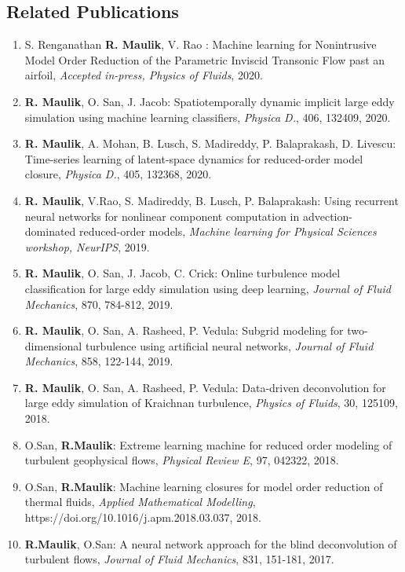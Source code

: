 \documentclass[11pt]{article}
\begin{document}
\subsection*{Related Publications}
\begin{enumerate}
\parskip = -2pt

\item S. Renganathan \textbf{R. Maulik}, V. Rao : Machine learning for Nonintrusive Model Order Reduction of the Parametric Inviscid Transonic Flow past an airfoil, {\it Accepted in-press, Physics of Fluids}, 2020.

\item \textbf{R. Maulik}, O. San, J. Jacob: Spatiotemporally dynamic implicit large eddy simulation using machine learning classifiers, {\it Physica D.}, 406, 132409, 2020.

\item \textbf{R. Maulik}, A. Mohan, B. Lusch, S. Madireddy, P. Balaprakash, D. Livescu: Time-series learning of latent-space dynamics for reduced-order model closure, {\it Physica D.}, 405, 132368, 2020.

\item \textbf{R. Maulik}, V.Rao, S. Madireddy, B. Lusch, P. Balaprakash: Using recurrent neural networks for nonlinear component computation in advection-dominated reduced-order models, \textit{Machine learning for Physical Sciences workshop, NeurIPS}, 2019.

\item \textbf{R. Maulik}, O. San, J. Jacob, C. Crick: Online turbulence model classification for large eddy simulation using deep learning, {\it Journal of Fluid Mechanics}, 870, 784-812, 2019.

\item \textbf{R. Maulik}, O. San, A. Rasheed, P. Vedula: Subgrid modeling for two-dimensional turbulence using artificial neural networks, {\it Journal of Fluid Mechanics}, 858, 122-144, 2019.

\item \textbf{R. Maulik}, O. San, A. Rasheed, P. Vedula: Data-driven deconvolution for large eddy simulation of Kraichnan turbulence, {\it Physics of Fluids}, 30, 125109, 2018.

\item O.San, \textbf{R.Maulik}: Extreme learning machine for reduced order modeling of turbulent geophysical flows, {\it Physical Review E}, 97, 042322, 2018.

\item O.San, \textbf{R.Maulik}: Machine learning closures for model order reduction of thermal fluids,  {\it Applied Mathematical Modelling}, https://doi.org/10.1016/j.apm.2018.03.037, 2018.

\item \textbf{R.Maulik}, O.San: A neural network approach for the blind deconvolution of turbulent flows, {\it Journal of Fluid Mechanics}, 831, 151-181, 2017.

\end{enumerate}
\end{document}
